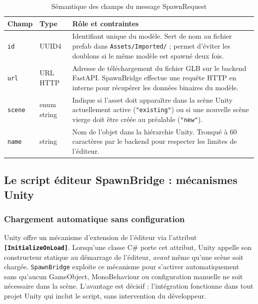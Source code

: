 \documentclass[12pt,a4paper,oneside]{report}
\newcommand{\theadrow}{\rowcolor{tekupblue!12}}
\begin{document}
\begin{table}[H]
\centering
\caption{Sémantique des champs du message SpawnRequest}
\label{tab:spawnreq}
\begin{tabularx}{\linewidth}{@{}llX@{}}
\toprule
\theadrow
\textbf{Champ} & \textbf{Type} & \textbf{Rôle et contraintes} \\\midrule
\texttt{id}
  & UUID4
  & Identifiant unique du modèle. Sert de nom au fichier prefab dans
    \texttt{Assets/Imported/} ; permet d'éviter les doublons si le
    même modèle est spawné deux fois. \\
\texttt{url}
  & URL HTTP
  & Adresse de téléchargement du fichier GLB sur le backend FastAPI.
    SpawnBridge effectue une requête HTTP en interne pour récupérer
    les données binaires du modèle. \\
\texttt{scene}
  & enum string
  & Indique si l'asset doit apparaître dans la scène Unity actuellement
    active (\texttt{"existing"}) ou si une nouvelle scène vierge doit
    être créée au préalable (\texttt{"new"}). \\
\texttt{name}
  & string
  & Nom de l'objet dans la hiérarchie Unity. Tronqué à 60 caractères
    par le backend pour respecter les limites de l'éditeur. \\
\bottomrule
\end{tabularx}
\end{table}

\subsection{Le script éditeur SpawnBridge : mécanismes Unity}

\subsubsection{Chargement automatique sans configuration}

Unity offre un mécanisme d'extension de l'éditeur via l'attribut
\textbf{\texttt{[InitializeOnLoad]}}. Lorsqu'une classe C\# porte
cet attribut, Unity appelle son constructeur statique au démarrage
de l'éditeur, \textit{avant} même qu'une scène soit chargée.
\texttt{SpawnBridge} exploite ce mécanisme pour s'activer
automatiquement sans qu'aucun GameObject, MonoBehaviour ou
configuration manuelle ne soit nécessaire dans la scène.
L'avantage est décisif : l'intégration fonctionne dans tout
projet Unity qui inclut le script, sans intervention du développeur.
\end{document}
